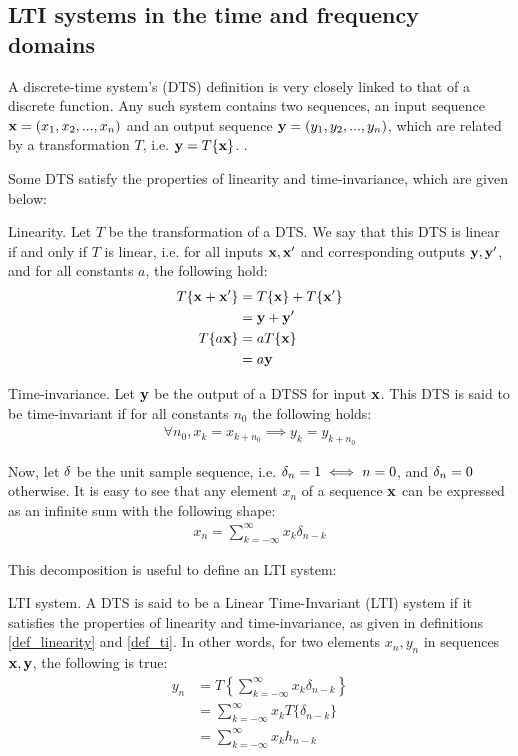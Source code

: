\documentclass[../main.tex]{subfiles}
\begin{document}
\subsection{LTI systems in the time and frequency domains} \label{subsection_lti} 
A discrete-time system's (DTS) definition is very closely linked to that of a discrete function. Any such system contains two sequences, an input sequence $\mathbf{x} = (x_1, x_2, ..., x_n)$ and an output sequence $\mathbf{y} = (y_1, y_2, ..., y_n)$, which are related by a transformation $T$, i.e. $\mathbf{y} = T\{\mathbf{x}\}$.  \cite{Oppenheim2010}. 
\par Some DTS satisfy the properties of linearity and time-invariance, which are given below:
\begin{definition}{Linearity.} \label{def_linearity}
Let $T$ be the transformation of a DTS. We say that this DTS is linear if and only if $T$ is linear, i.e. for all inputs $\mathbf{x, x}'$ and corresponding outputs $\mathbf{y, y}'$, and for all constants $a$, the following hold:
\begin{align*}
T\{\mathbf{x} + \mathbf{x}'\} &= T\{\mathbf{x}\} + T\{\mathbf{x}'\} \\
&= \mathbf{y} + \mathbf{y}'\\
T\{a\mathbf{x}\} &= aT\{\mathbf{x}\}\\
&= a\mathbf{y}
\end{align*}
\end{definition}
\begin{definition}{Time-invariance.} \label{def_ti}
Let $\mathbf{y}$ be the output of a DTSS for input $\mathbf{x}$. This DTS is said to be time-invariant if for all constants $n_0$ the following holds:
\begin{align*}
\forall n_0, x_k = x_{k+n_0} \implies y_k = y_{k+n_0}
\end{align*}
\end{definition}
\par Now, let $\mathbf{\delta}$ be the unit sample sequence, i.e. $\mathbf{\delta}_n = 1 \iff n = 0$, and $\mathbf{\delta}_n = 0$ otherwise. It is easy to see that any element $x_n$ of a sequence $\mathbf{x}$ can be expressed as an infinite sum with the following shape:
\begin{align*}
x_n = \sum_{k=-\infty}^{\infty}x_k\delta_{n-k}
\end{align*}
\par This decomposition is useful to define an LTI system:
\begin{definition}{LTI system.} \label{def_lti}
A DTS is said to be a Linear Time-Invariant (LTI) system if it satisfies the properties of linearity and time-invariance, as given in definitions \ref{def_linearity} and \ref{def_ti}. In other words, for two elements $x_n, y_n$ in sequences $\mathbf{x, y}$, the following is true:
\begin{align*}
y_n &= T\left\{\sum_{k=-\infty}^{\infty}x_k\delta_{n-k}\right\}\\
&= \sum_{k=-\infty}^{\infty}x_kT\{\delta_{n-k}\}\\
&= \sum_{k=-\infty}^{\infty}x_kh_{n-k}
\end{align*}
\end{definition} 
\end{document}
